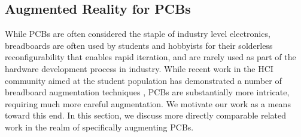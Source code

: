 \documentclass [11pt, proquest] {uwthesis}[2020/02/24]
\begin{document}
\subsection{Augmented Reality for PCBs}


While PCBs are often considered the staple of industry level electronics, breadboards are often used by students and hobbyists for their solderless reconfigurability that enables rapid iteration, and are rarely used as part of the hardware development process in industry.
While recent work in the HCI community aimed at the student population has demonstrated a number of breadboard augmentation techniques \cite{Ochiai2014VisibleElectricity, Drew2016TheToastboard, Wu2017CurrentViz, Kim2019VirtualComponent}, PCBs are substantially more intricate, requiring much more careful augmentation.
We motivate our work as a means toward this end.
In this section, we discuss more directly comparable related work in the realm of specifically augmenting PCBs.
\end{document}
